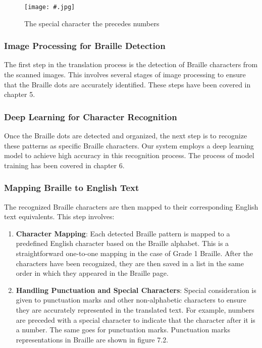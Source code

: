 \begin{figure}[h]
\centering
\texttt{[image: \#.jpg]}
\caption{The special character the precedes numbers}
\label{fig:tacotron_model}
\end{figure}

\subsubsection{Image Processing for Braille Detection}

The first step in the translation process is the detection of Braille characters from the scanned images. This involves several stages of image processing to ensure that the Braille dots are accurately identified. These steps have been covered in chapter 5.

\subsubsection{Deep Learning for Character Recognition}

Once the Braille dots are detected and organized, the next step is to recognize these patterns as specific Braille characters. Our system employs a deep learning model to achieve high accuracy in this recognition process. The process of model training has been covered in chapter 6.

\subsubsection{Mapping Braille to English Text}

The recognized Braille characters are then mapped to their corresponding English text equivalents. This step involves:

\begin{enumerate}
    \item \textbf{Character Mapping}: Each detected Braille pattern is mapped to a predefined English character based on the Braille alphabet. This is a straightforward one-to-one mapping in the case of Grade 1 Braille. After the characters have been recognized, they are then saved in a list in the same order in which they appeared in the Braille page.
    \item \textbf{Handling Punctuation and Special Characters}: Special consideration is given to punctuation marks and other non-alphabetic characters to ensure they are accurately represented in the translated text. For example, numbers are preceded with a special character to indicate that the character after it is a number. The same goes for punctuation marks. Punctuation marks representations in Braille are shown in figure 7.2.
\end{enumerate}

